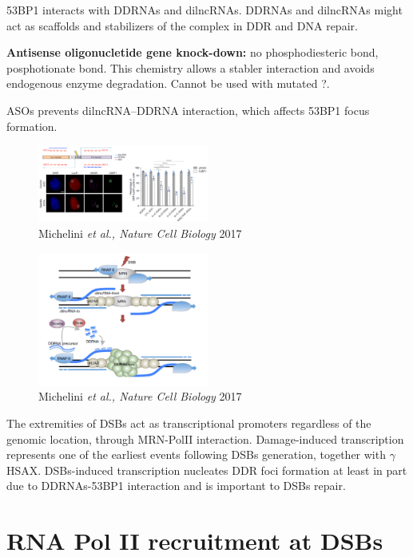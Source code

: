 53BP1 interacts with DDRNAs and dilncRNAs. DDRNAs and dilncRNAs might act as scaffolds and stabilizers of the complex in DDR and DNA repair.

\textbf{Antisense oligonucletide gene knock-down:} no phosphodiesteric bond, posphotionate bond. This chemistry allows a stabler interaction and avoids endogenous enzyme degradation. Cannot be used with mutated ?.

ASOs prevents dilncRNA--DDRNA interaction, which affects 53BP1 focus formation.

\begin{figure}
\centering
\includegraphics[width=0.5\textwidth]{Screen_Shot_2022-12-07_at_09-50-28.png}
\caption{Michelini \emph{et al., Nature Cell Biology} 2017}
\end{figure}

\begin{figure}
\centering
\includegraphics[width=0.5\textwidth]{Screen_Shot_2022-12-07_at_09-51-02.png}
\caption{Michelini \emph{et al., Nature Cell Biology} 2017}
\end{figure}

The extremities of DSBs act as transcriptional promoters regardless of the genomic location, through MRN-PolII interaction. Damage-induced transcription represents one of the earliest events following DSBs generation, together with \(\gamma\)HSAX. DSBs-induced transcription nucleates DDR foci formation at least in part due to DDRNAs-53BP1 interaction and is important to DSBs repair.

\hypertarget{rna-pol-ii-recruitment-at-dsbs}{%
\section{RNA Pol II recruitment at DSBs}\label{rna-pol-ii-recruitment-at-dsbs}}

